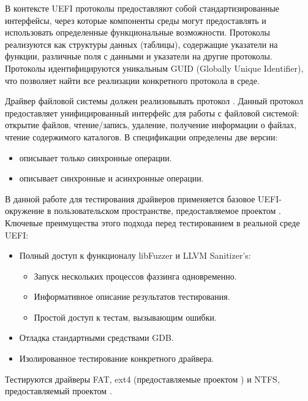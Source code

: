В контексте UEFI протоколы предоставляют собой стандартизированные интерфейсы, через которые компоненты среды могут предоставлять и использовать определенные функциональные возможности. Протоколы реализуются как структуры данных (таблицы), содержащие указатели на функции, различные поля с данными и указатели на другие протоколы. Протоколы идентифицируются уникальным GUID (Globally Unique Identifier), что позволяет найти все реализации конкретного протокола в среде.

 Драйвер файловой системы должен реализовывать протокол . Данный протокол предоставляет унифицированный интерфейс для работы с файловой системой: открытие файлов, чтение/запись, удаление, получение информации о файлах, чтение содержимого каталогов. В спецификации определены две версии:
 \begin{itemize}
 	\item {} описывает только синхронные операции.
 	\item {} описывает синхронные и асинхронные операции.
 \end{itemize}
 
В данной работе для тестирования драйверов применяется базовое UEFI-окружение в пользовательском пространстве, предоставляемое проектом  \cite{OpenCorePkg}. Ключевые преимущества этого подхода перед тестированием в реальной среде UEFI:
\begin{itemize}
	\item Полный доступ к функционалу libFuzzer и LLVM Sanitizer's:
	\begin{itemize}
		\item Запуск нескольких процессов фаззинга  одновременно.
		\item Информативное описание результатов тестирования.
		\item Простой доступ к тестам, вызывающим ошибки.
	\end{itemize}
	\item Отладка стандартными средствами GDB.
	\item Изолированное тестирование конкретного драйвера.
\end{itemize}
 
 Тестируются драйверы FAT, ext4 (предоставляемые проектом  \cite{Audk}) и NTFS, предоставляемый проектом \cite{OpenCorePkg}.  